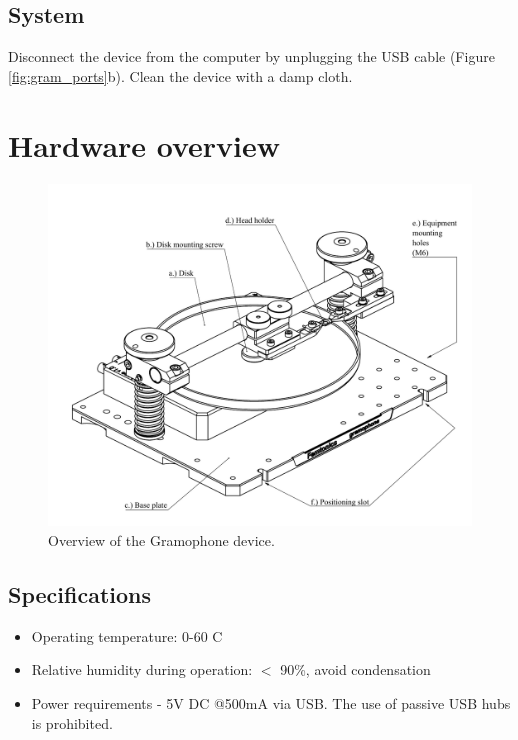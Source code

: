 \documentclass[11pt,a4paper]{article}
\begin{document}
\subsection{System}
Disconnect the device from the computer by unplugging the USB cable (Figure \ref{fig:gram_ports}b). Clean the device with a damp cloth.

\newpage
\section{Hardware overview}
\begin{figure}[h] %
\centering
\includegraphics[clip, trim=1cm 0cm 0cm 1cm, width=1.00\textwidth]{labels_overview.PDF}
\caption{Overview of the Gramophone device.}
\label{fig:gram_overview}
\end{figure}


\subsection{Specifications}
\begin{itemize}
\item Operating temperature: 0-60 \degree C
\item Relative humidity during operation:  $<$ 90\%, avoid condensation 
\item Power requirements - 5V DC @500mA via USB. The use of passive USB hubs is prohibited.
\end{itemize}
\end{document}
